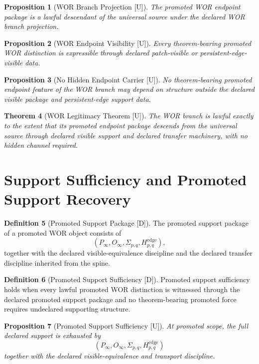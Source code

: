 \documentclass[11pt]{article}
\newtheorem{theorem}{Theorem}[section]
\newtheorem{proposition}[theorem]{Proposition}
\theoremstyle{definition}
\newtheorem{definition}[theorem]{Definition}
\theoremstyle{remark}
\newcommand{\U}{\textnormal{[U]}}
\newcommand{\D}{\textnormal{[D]}}
\newcommand{\Pinf}{P_\infty}
\newcommand{\Oinf}{O_\infty}
\newcommand{\Sigmaedge}{\Sigma_{p,q}}
\newcommand{\Hedge}{H^{\mathrm{edge}}_{p,q}}
\begin{document}
\begin{proposition}[WOR Branch Projection {\U}]
The promoted WOR endpoint package is a lawful descendant of the universal source under the declared WOR branch projection.
\end{proposition}

\begin{proposition}[WOR Endpoint Visibility {\U}]
Every theorem-bearing promoted WOR distinction is expressible through declared patch-visible or persistent-edge-visible data.
\end{proposition}

\begin{proposition}[No Hidden Endpoint Carrier {\U}]
No theorem-bearing promoted endpoint feature of the WOR branch may depend on structure outside the declared visible package and persistent-edge support data.
\end{proposition}

\begin{theorem}[WOR Legitimacy Theorem {\U}]
The WOR branch is lawful exactly to the extent that its promoted endpoint package descends from the universal source through declared visible support and declared transfer machinery, with no hidden channel required.
\end{theorem}

\section{Support Sufficiency and Promoted Support Recovery}

\begin{definition}[Promoted Support Package {\D}]
The promoted support package of a promoted WOR object consists of
\[
(\Pinf,\Oinf,\Sigmaedge,\Hedge),
\]
together with the declared visible-equivalence discipline and the declared transfer discipline inherited from the spine.
\end{definition}

\begin{definition}[Promoted Support Sufficiency {\D}]
Promoted support sufficiency holds when every lawful promoted WOR distinction is witnessed through the declared promoted support package and no theorem-bearing promoted force requires undeclared supporting structure.
\end{definition}

\begin{proposition}[Promoted Support Sufficiency {\U}]
At promoted scope, the full declared support is exhausted by
\[
(\Pinf,\Oinf,\Sigmaedge,\Hedge)
\]
together with the declared visible-equivalence and transport discipline.
\end{proposition}
\end{document}

